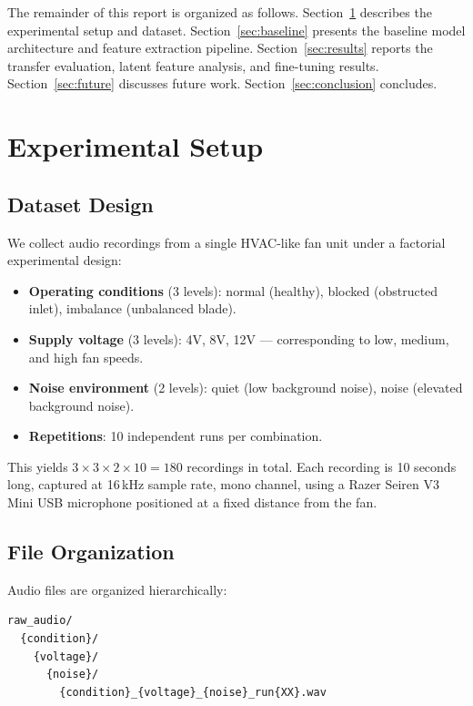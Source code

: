 \documentclass[12pt, a4paper]{article}
\begin{document}
The remainder of this report is organized as follows. Section~\ref{sec:setup} describes the experimental setup and dataset. Section~\ref{sec:baseline} presents the baseline model architecture and feature extraction pipeline. Section~\ref{sec:results} reports the transfer evaluation, latent feature analysis, and fine-tuning results. Section~\ref{sec:future} discusses future work. Section~\ref{sec:conclusion} concludes.


\section{Experimental Setup}
\label{sec:setup}

\subsection{Dataset Design}

We collect audio recordings from a single HVAC-like fan unit under a factorial experimental design:

\begin{itemize}
    \item \textbf{Operating conditions} (3 levels): normal (healthy), blocked (obstructed inlet), imbalance (unbalanced blade).
    \item \textbf{Supply voltage} (3 levels): 4V, 8V, 12V --- corresponding to low, medium, and high fan speeds.
    \item \textbf{Noise environment} (2 levels): quiet (low background noise), noise (elevated background noise).
    \item \textbf{Repetitions}: 10 independent runs per combination.
\end{itemize}

This yields $3 \times 3 \times 2 \times 10 = 180$ recordings in total. Each recording is 10 seconds long, captured at 16\,kHz sample rate, mono channel, using a Razer Seiren V3 Mini USB microphone positioned at a fixed distance from the fan.

\subsection{File Organization}

Audio files are organized hierarchically:

\begin{verbatim}
raw_audio/
  {condition}/
    {voltage}/
      {noise}/
        {condition}_{voltage}_{noise}_run{XX}.wav
\end{verbatim}
\end{document}
